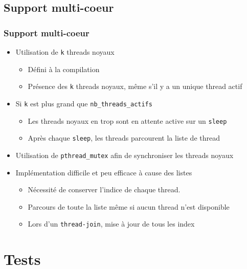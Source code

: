 \documentclass{beamer}
\begin{document}
\subsection{Support multi-coeur}

\begin{frame}[containsverbatim]
  \frametitle{Support multi-coeur}
  \begin{itemize}
    \item Utilisation de \verb!k! threads noyaux
      \begin{itemize}
      \item Défini à la compilation
      \item Présence des \verb!k! threads noyaux, même s'il y a un unique
        thread actif
      \end{itemize}
    \item Si \verb!k! est plus grand que \verb!nb_threads_actifs!
      \begin{itemize}
        \item Les threads noyaux en trop sont en attente active sur un
          \verb!sleep!
        \item Après chaque \verb!sleep!, les threads parcourent la liste de
          thread
      \end{itemize}
    \item Utilisation de \verb!pthread_mutex! afin de synchroniser les
      threads noyaux
    \item Implémentation difficile et peu efficace à cause des listes
      \begin{itemize}
      \item Nécessité de conserver l'indice de chaque thread.
      \item Parcours de toute la liste même si aucun thread n'est disponible
      \item Lors d'un \verb!thread-join!, mise à jour de tous les index
      \end{itemize}
  \end{itemize}
\end{frame}

\section{Tests}
\end{document}
